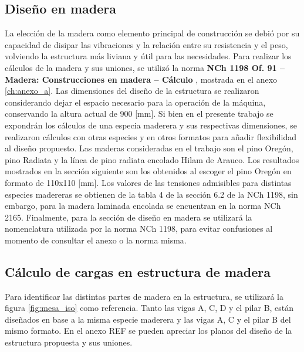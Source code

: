 \subsection{Diseño en madera}
La elección de la madera como elemento principal de construcción se debió por su capacidad de disipar las vibraciones y la relación entre su resistencia y el peso, volviendo la estructura más liviana y útil para las necesidades. Para realizar los cálculos de la madera y sus uniones, se utilizó la norma \textbf{NCh 1198 Of. 91 -- Madera: Construcciones en madera -- Cálculo} \cite{nch1198}, mostrada en el anexo \ref{ch:anexo_a}. Las dimensiones del diseño de la estructura se realizaron considerando dejar el espacio necesario para la operación de la máquina, conservando la altura actual de 900 [mm]. Si bien en el presente trabajo se expondrán los cálculos de una especia maderera y sus respectivas dimensiones, se realizaron cálculos con otras especies y en otros formatos para añadir flexibilidad al diseño propuesto. Las maderas consideradas en el trabajo son el pino Oregón, pino Radiata y la línea de pino radiata encolado Hilam de Arauco. Los resultados mostrados en la sección siguiente son los obtenidos al escoger el pino Oregón en formato de 110x110 [mm]. Los valores de las tensiones admisibles para distintas especies madereras se obtienen de la tabla 4 de la sección 6.2 de la NCh 1198, sin embargo, para la madera laminada encolada se encuentran en la norma NCh 2165. Finalmente, para la sección de diseño en madera se utilizará la nomenclatura utilizada por la norma NCh 1198, para evitar confusiones al momento de consultar el anexo o la norma misma.

\subsection{Cálculo de cargas en estructura de madera}
Para identificar las distintas partes de madera en la estructura, se utilizará la figura \ref{fig:mesa_iso} como referencia. Tanto las vigas A, C, D y el pilar B, están diseñados en base a la misma especie maderera y las vigas A, C y el pilar B del mismo formato. En el anexo REF se pueden apreciar los planos del diseño de la estructura propuesta y sus uniones.


